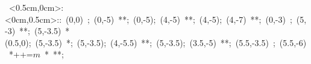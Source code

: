 \hbox{
\xy    <0.5cm,0cm>:<0cm,0.5cm>::
       (0,0) ; (0,-5) **\dir{-};
	   (0,-5); (4,-5) **\dir{-};
	   (4,-5); (4,-7) **\dir{-};    %
	   (0,-3) ; (5,-3) **\dir{-}; 
       (5,-3.5) *\cir(0.5,0){};     %
       (5,-3.5) *{\bullet};
	   (5,-3.5); (4,-5.5) **\dir{-};
	   (5,-3.5); (3.5,-5) **\dir{-};
	   (5.5,-3.5)  ; (5.5,-6) *++={\hbox{$m$}} *\frm{-,} **\dir{-};
	   \endxy}



